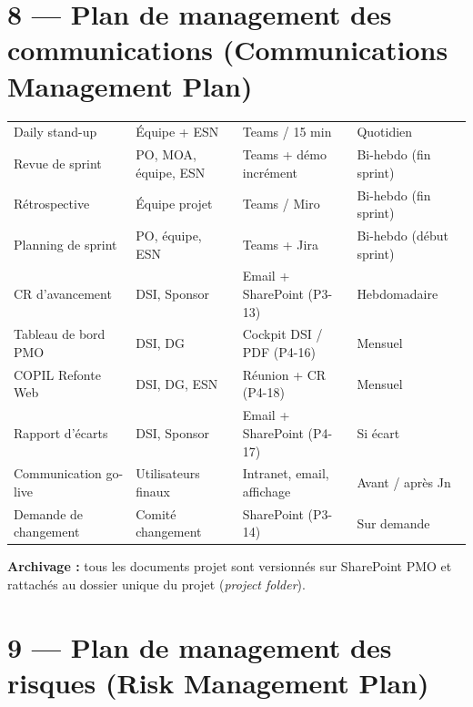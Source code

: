 \documentclass[11pt,a4paper,oneside]{report}
\begin{document}
\section*{8 — Plan de management des communications (Communications Management Plan)}

\renewcommand{\arraystretch}{1.3}
\begin{tabularx}{\textwidth}{L{3.8cm} L{3cm} Y C{2cm}}
\toprule
{} &  &  &  \\
\midrule
Daily stand-up        & Équipe + ESN              & Teams / 15 min                      & Quotidien \\
Revue de sprint       & PO, MOA, équipe, ESN      & Teams + démo incrément              & Bi-hebdo (fin sprint) \\
Rétrospective         & Équipe projet             & Teams / Miro                        & Bi-hebdo (fin sprint) \\
Planning de sprint    & PO, équipe, ESN           & Teams + Jira                        & Bi-hebdo (début sprint) \\
CR d'avancement       & DSI, Sponsor              & Email + SharePoint (P3-13)          & Hebdomadaire \\
Tableau de bord PMO   & DSI, DG                   & Cockpit DSI / PDF (P4-16)           & Mensuel \\
COPIL Refonte Web     & DSI, DG, ESN              & Réunion + CR (P4-18)                & Mensuel \\
Rapport d'écarts      & DSI, Sponsor              & Email + SharePoint (P4-17)          & Si écart \\
Communication go-live & Utilisateurs finaux       & Intranet, email, affichage          & Avant / après Jn \\
Demande de changement & Comité changement         & SharePoint (P3-14)                  & Sur demande \\
\bottomrule
\end{tabularx}

\textbf{Archivage :} tous les documents projet sont versionnés sur SharePoint PMO et
rattachés au dossier unique du projet (\textit{project folder}).

\section*{9 — Plan de management des risques (Risk Management Plan)}
\end{document}
